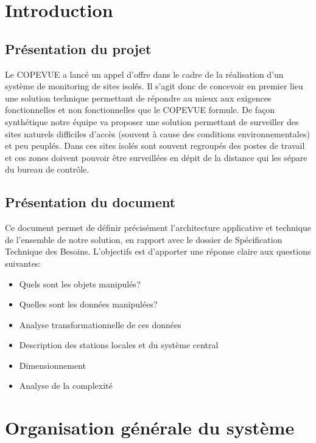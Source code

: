 \section{Introduction}

\subsection{Présentation du projet}

Le COPEVUE a lancé un appel d'offre dans le cadre de la réalisation d'un système de monitoring de sites isolés. Il s'agit donc de concevoir en premier lieu une solution technique permettant de répondre au mieux aux exigences fonctionnelles et non fonctionnelles que le COPEVUE formule. De façon synthétique notre équipe va proposer une solution permettant de surveiller des sites naturels difficiles d'accès (souvent à cause des conditions environnementales) et peu peuplés. Dans ces sites isolés sont souvent regroupés des postes de travail et ces zones doivent pouvoir être surveillées en dépit de la distance qui les sépare du bureau de contrôle.

\subsection{Présentation du document}

Ce document permet de définir précisément l'architecture applicative et technique de l'ensemble de notre solution, en rapport avec le dossier de Spécification Technique des Besoins. L'objectifs est d'apporter une réponse claire aux questions suivantes:

\begin{itemize}
	\item Quels sont les objets manipulés?
	\item Quelles sont les données manipulées?
	\item Analyse transformationnelle de ces données
	\item Description des stations locales et du système central
	\item Dimensionnement
	\item Analyse de la complexité
\end{itemize}

\section{Organisation générale du système}

